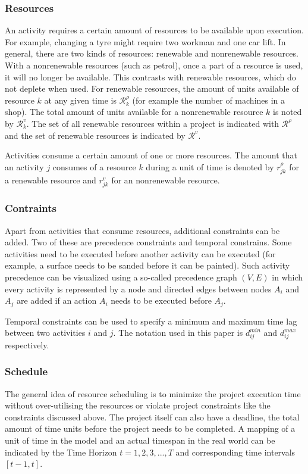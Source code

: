 \documentclass{article}
\begin{document}
\subsubsection{Resources}
An activity requires a certain amount of resources to be available upon execution. For example, changing a tyre might require two workman and one car lift. In general, there are two kinds of resources: renewable and nonrenewable resources. With a nonrenewable resources (such as petrol), once a part of a resource is used, it will no longer be available. This contrasts with renewable resources, which do not deplete when used. For renewable resources, the amount of units available of resource $k$ at any given time is $\mathcal{R}^{\rho}_k$ (for example the number of machines in a shop). The total amount of units available for a nonrenewable resource $k$ is noted by $\mathcal{R}^{v}_k$. The set of all renewable resources within a project is indicated with $\mathcal{R}^{\rho}$ and the set of renewable resources is indicated by $\mathcal{R}^{v}$. 

Activities consume a certain amount of one or more resources. The amount that an activity $j$ consumes of a resource $k$ during a unit of time is denoted by $r^{\rho}_{jk}$ for a renewable resource and  $r^{v}_{jk}$ for an nonrenewable resource. 

\subsubsection{Contraints}
Apart from activities that consume resources, additional constraints can be added. Two of these are precedence constraints and temporal constrains. Some activities need to be executed before another activity can be executed (for example, a surface needs to be sanded before it can be painted). Such activity precedence can be visualized using a so-called precedence graph $(V, E)$ in which every activity is represented by a node and directed edges between nodes $A_i$ and $A_j$ are added if an action $A_i$ needs to be executed before $A_j$.

Temporal constraints can be used to specify a minimum and maximum time lag between two activities $i$ and $j$. The notation used in this paper is $d^{min}_{ij}$ and $d^{max}_{ij}$ respectively.

\subsubsection{Schedule}
The general idea of resource scheduling is to minimize the project execution time without over-utilising the resources or violate project constraints like the constraints discussed above. The project itself can also have a deadline, the total amount of time units before the project needs to be completed. A mapping of a unit of time in the model and an actual timespan in the real world can be indicated by the Time Horizon $t=1,2,3,. . .,T$ and corresponding time intervals $[t-1,t]$. 
\end{document}
